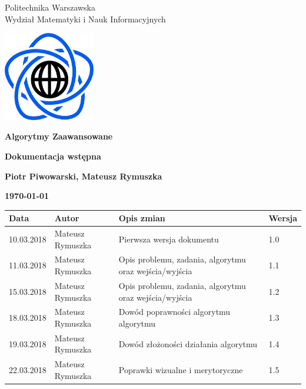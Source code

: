 \documentclass[10pt,a4paper]{article}
\begin{document}
	\begin{titlepage}
		\begin{center}
			{\fontsize{14}{12}\selectfont Politechnika Warszawska \\ Wydział Matematyki i Nauk Informacyjnych}
			
		\end{center}
		
		\vspace{1cm}
		\begin{center}
			\includegraphics[width=0.3\textwidth]{images/logo.png}
		\end{center}
		\vspace{3cm}
		
		\begin{center}
			\textbf{{\fontsize{26}{12}\selectfont Algorytmy Zaawansowane}}
			
			\vspace{2cm}
			\textbf{{\fontsize{22}{12}\selectfont Dokumentacja wstępna}}
			\vspace{1cm}
			
			\textbf{{\fontsize{13.5}{12}\selectfont Piotr Piwowarski, Mateusz Rymuszka}}
			
			\vspace{6cm}
			\textbf{{\fontsize{13.5}{12}\selectfont \today}}
		\end{center}  
	\end{titlepage}
	
	{\fontsize{13.5}{12}\selectfont
		\tableofcontents
		\vspace{1cm}
		{\renewcommand{\arraystretch}{2.0}
			
			\begin{tabularx}{\textwidth}{|l|l|X|l|}
				\hline 
				Data & Autor & Opis zmian & Wersja\\
				\hline
				10.03.2018 & Mateusz Rymuszka & Pierwsza wersja dokumentu & 1.0 \\
				\hline
				11.03.2018 & Mateusz Rymuszka & Opis problemu, zadania, algorytmu oraz wejścia/wyjścia & 1.1 \\
				\hline
				15.03.2018 & Mateusz Rymuszka & Opis problemu, zadania, algorytmu oraz wejścia/wyjścia & 1.2 \\
				\hline
				18.03.2018 & Mateusz Rymuszka & Dowód poprawności algorytmu algorytmu & 1.3 \\
				\hline
				19.03.2018 & Mateusz Rymuszka & Dowód złożoności działania algorytmu & 1.4 \\
				\hline
				22.03.2018 & Mateusz Rymuszka & Poprawki wizualne i merytoryczne & 1.5 \\
				\hline
			\end{tabularx} 
	}}
	
\end{document}
